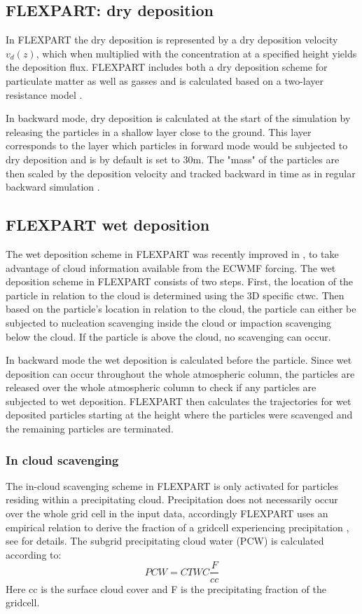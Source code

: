 \subsection{FLEXPART: dry deposition}
In FLEXPART the dry deposition is represented by a dry deposition velocity $v_d(z)$, which when multiplied with the concentration at a specified height yields the deposition flux. 
FLEXPART includes both a dry deposition scheme for particulate matter as well as gasses and is calculated based on a two-layer resistance model \parencite{Flexpart-2005_ref_paper}.

In backward mode, dry deposition is calculated at the start of the simulation by releasing the particles in a shallow layer close to the ground. This layer corresponds to the layer which particles in forward mode would be subjected to dry deposition and is by default is set to 30m. The "mass" of the particles are then scaled by the deposition velocity and tracked backward in time as in regular backward simulation \parencite{eckhardt2017source}. 

\subsection{FLEXPART wet deposition}
The wet deposition scheme in FLEXPART was recently improved in \textcite{flexpart_wetdep}, to take advantage of cloud information available from the ECWMF forcing. The wet deposition scheme in FLEXPART consists of two steps.
First, the location of the particle in relation to the cloud is determined using the 3D specific \acrfull{ctwc}. Then based on the particle's location in relation to the cloud, the particle can either be subjected to nucleation scavenging inside the cloud or impaction scavenging below the cloud. If the particle is above the cloud, no scavenging can occur. 

In backward mode the wet deposition is calculated before the particle. Since wet deposition can occur throughout the whole atmospheric column, the particles are released over the whole atmospheric column to check if any particles are subjected to wet deposition. FLEXPART then calculates the trajectories for wet deposited particles starting at the height where the particles were scavenged and the remaining particles are terminated.    
\subsubsection{In cloud scavenging}
The in-cloud scavenging scheme in FLEXPART is only activated for particles residing within a precipitating cloud. Precipitation does not necessarily occur over the whole grid cell in the input data, accordingly FLEXPART uses an empirical relation to derive the fraction of a gridcell experiencing precipitation , see \textcite{Flexpart-2005_ref_paper} for details. The subgrid precipitating cloud water (PCW) is calculated according to: 
\begin{equation}
    PCW = CTWC\frac{F}{cc}
\end{equation}
Here cc is the surface cloud cover and F is the precipitating fraction of the gridcell. 

